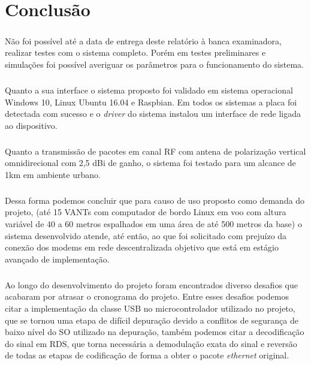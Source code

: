 \chapter{Conclusão}
\paragraph{} Não foi possível até a data de entrega deste relatório à banca examinadora, realizar testes com o sistema completo. Porém em testes preliminares e simulações foi possível averiguar os parâmetros para o funcionamento do sistema. 

\paragraph{} Quanto a sua interface o sistema proposto foi validado em sistema operacional Windows 10, Linux Ubuntu 16.04 e Raspbian. Em todos os sistemas a placa foi detectada com sucesso e o \textit{driver} do sistema instalou um interface de rede ligada ao dispositivo.

\paragraph{} Quanto a transmissão de pacotes em canal RF com antena de polarização vertical omnidirecional com 2,5 dBi de ganho, o sistema foi testado para um alcance de 1km em ambiente urbano.

\paragraph{} Dessa forma podemos concluir que para causo de uso proposto como demanda do projeto, (até 15 VANTs com computador de bordo Linux em voo com altura variável de 40 a 60 metros espalhados em uma área de até 500 metros da base) o sistema desenvolvido atende, até então, ao que foi solicitado com prejuízo da conexão dos modems em rede descentralizada objetivo que está em estágio avançado de implementação.

\paragraph{} Ao longo do desenvolvimento do projeto foram encontrados diverso desafios que acabaram por atrasar o cronograma do projeto. Entre esses desafios podemos citar a implementação da classe USB no microcontrolador utilizado no projeto, que se tornou uma etapa de difícil depuração devido a conflitos de segurança de baixo nível do SO utilizado na depuração, também podemos citar a decodificação do sinal em RDS, que torna necessária a demodulação exata do sinal e reversão de todas as etapas de codificação de forma a obter o pacote \textit{ethernet} original.

